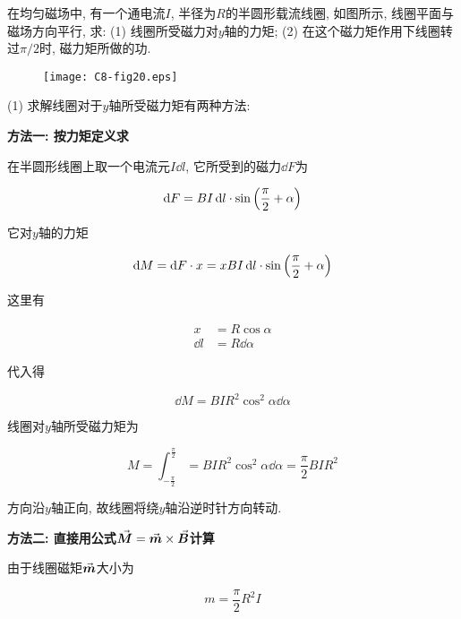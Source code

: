 \begin{example}
	在均匀磁场中, 有一个通电流$I$, 半径为$R$的半圆形载流线圈, 如图所示, 线圈平面与磁场方向平行, 求: 
	(1) 线圈所受磁力对$y$轴的力矩;
	(2) 在这个磁力矩作用下线圈转过$\pi / 2$时, 磁力矩所做的功.
	
	\begin{figure}[H]
		\centering
		\texttt{[image: C8-fig20.eps]}
	\end{figure}
	
	\begin{solution}
		
		(1) 求解线圈对于$y$轴所受磁力矩有两种方法: 
		
		\textbf{方法一: 按力矩定义求}
		
		在半圆形线圈上取一个电流元$I\dd{l}$, 它所受到的磁力$\dd{F}$为
		
		\begin{equation*}
			\dd{F} = BI\dd{l} \cdot \sin\qty(\dfrac{\pi}{2} + \alpha) 
		\end{equation*}
		
		它对$y$轴的力矩
		
		\begin{equation*}
			\dd{M} = \dd{F} \cdot x = xBI\dd{l} \cdot \sin \qty(\dfrac{\pi}{2} + \alpha) 
		\end{equation*}
		
		这里有
		
		\begin{align*}
			x &= R \cos \alpha \\
			\dd{l} &= R \dd{\alpha}
		\end{align*}
		
		代入得
		
		\begin{equation*}
			\dd{M} = BIR^2 \cos^2 \alpha \dd{\alpha}
		\end{equation*}
		
		线圈对$y$轴所受磁力矩为
		
		\begin{equation*}
			M = \int_{-\frac{\pi}{2}}^{\frac{\pi}{2}} = BIR^2 \cos^2 \alpha \dd{\alpha} = \dfrac{\pi}{2} BIR^2
		\end{equation*}
		
		方向沿$y$轴正向, 故线圈将绕$y$轴沿逆时针方向转动. 
		
		\textbf{方法二: 直接用公式$\va*{M} = \va*{m} \times \va*{B}$计算}
		
		由于线圈磁矩$\va*{m}$大小为
		
		\begin{equation*}
			m = \dfrac{\pi}{2} R^2 I
		\end{equation*}
		

\end{solution}
\end{example}
